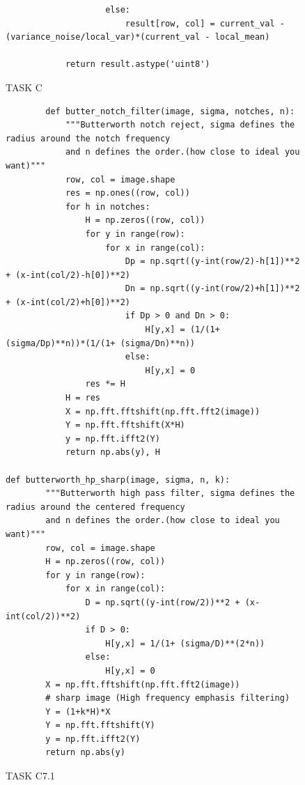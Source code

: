 {\begin{figure}[H]
\begin{lstlisting}
                    else:
                        result[row, col] = current_val - (variance_noise/local_var)*(current_val - local_mean)
            
            return result.astype('uint8')
    \end{lstlisting}
\caption{TASK C}
\label{TASK C}
\end{figure}




\begin{figure}[H]
    \begin{lstlisting}
        def butter_notch_filter(image, sigma, notches, n):
            """Butterworth notch reject, sigma defines the radius around the notch frequency
            and n defines the order.(how close to ideal you want)"""
            row, col = image.shape
            res = np.ones((row, col))
            for h in notches:
                H = np.zeros((row, col))
                for y in range(row):
                    for x in range(col):
                        Dp = np.sqrt((y-int(row/2)-h[1])**2 + (x-int(col/2)-h[0])**2)
                        Dn = np.sqrt((y-int(row/2)+h[1])**2 + (x-int(col/2)+h[0])**2)
                        if Dp > 0 and Dn > 0:
                            H[y,x] = (1/(1+ (sigma/Dp)**n))*(1/(1+ (sigma/Dn)**n))
                        else:
                            H[y,x] = 0
                res *= H
            H = res
            X = np.fft.fftshift(np.fft.fft2(image))
            Y = np.fft.fftshift(X*H)
            y = np.fft.ifft2(Y)
            return np.abs(y), H

def butterworth_hp_sharp(image, sigma, n, k):
        """Butterworth high pass filter, sigma defines the radius around the centered frequency
        and n defines the order.(how close to ideal you want)"""
        row, col = image.shape
        H = np.zeros((row, col))
        for y in range(row):
            for x in range(col):
                D = np.sqrt((y-int(row/2))**2 + (x-int(col/2))**2)
                if D > 0:
                    H[y,x] = 1/(1+ (sigma/D)**(2*n))
                else:
                    H[y,x] = 0
        X = np.fft.fftshift(np.fft.fft2(image))
        # sharp image (High frequency emphasis filtering)
        Y = (1+k*H)*X
        Y = np.fft.fftshift(Y)
        y = np.fft.ifft2(Y)
        return np.abs(y)

    \end{lstlisting}
\caption{TASK C7.1}
\label{TASK C7.1}
\end{figure}




}
